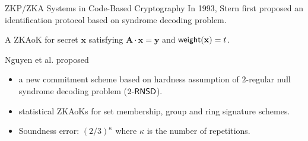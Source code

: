\begin{frame}{ZKP/ZKA Systems in Code-Based Cryptography}
	In 1993, Stern first proposed an identification protocol \cite{Stern93} based on syndrome decoding problem.\pause
	
	A ZKAoK for secret $\mathbf{x}$ satisfying $\mathbf{A}\cdot\mathbf{x} = \mathbf{y}$ and $\mathsf{weight}(\mathbf{x}) = t$. \pause
	
	Nguyen et al. \cite{NguyenTWZ19, NguyenTWZ19eprint} proposed \pause
	\begin{itemize}
		\item a new commitment scheme based on hardness assumption of $2$-regular null syndrome decoding problem (${2\textsf{-}\mathsf{RNSD}}$).\pause
		\item statistical ZKAoKs for set membership, group and ring signature schemes.\pause 
		\item Soundness error: $(2/3)^\kappa$ where $\kappa$ is the number of repetitions.
	\end{itemize}
\end{frame}